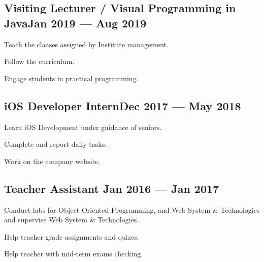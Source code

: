 \documentclass[letter,10pt]{article}
\begin{document}
\subsection{{Visiting Lecturer / Visual Programming in Java\hfill Jan 2019 --- Aug 2019}}
\begin{zitemize}
\item Teach the claases assigned by Institute management.
\item Follow the curriculum.
\item Engage students in practical programming.
\end{zitemize}

\subsection{{iOS Developer Intern\hfill Dec 2017 --- May 2018}}
\begin{zitemize}
\item Learn iOS Development under guidance of seniors.
\item Complete and report daily tasks.
\item Work on the company website.
\end{zitemize}

\subsection{{Teacher Assistant \hfill Jan 2016 --- Jan 2017}}
\begin{zitemize}
\item Conduct labs for Object Oriented Programming, and Web System \& Technologies and supervise Web System \& Technologies..
\item Help teacher grade assignments and quizes.
\item Help teacher with mid-term exams checking.
\end{zitemize}
\end{document}
